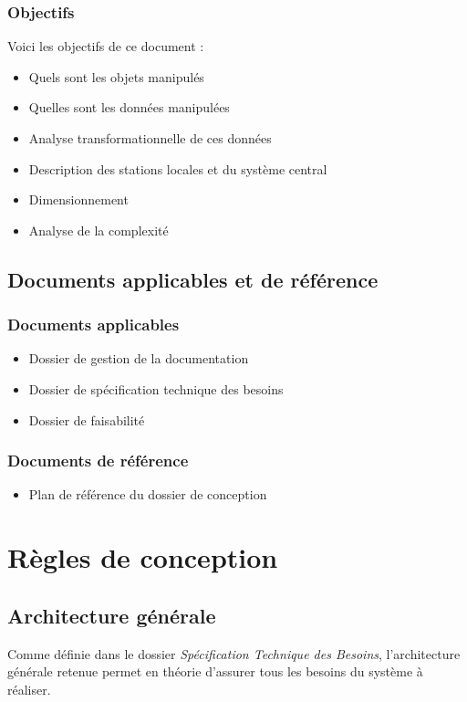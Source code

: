 \documentclass[a4paper, 11pt, final]{article}
\begin{document}
\subsubsection{Objectifs}
Voici les objectifs de ce document :
\begin{itemize}
\item Quels sont les objets manipulés
\item Quelles sont les données manipulées
\item Analyse transformationnelle de ces données
\item Description des stations locales et du système central
\item Dimensionnement
\item Analyse de la complexité
\end{itemize}

\subsection{Documents applicables et de référence}
\subsubsection{Documents applicables}
\begin{itemize}
\item Dossier de gestion de la documentation
\item Dossier de spécification technique des besoins
\item Dossier de faisabilité
\end{itemize}

\subsubsection{Documents de référence}
\begin{itemize}
\item Plan de référence du dossier de conception
\end{itemize}


\section{Règles de conception}

\subsection{Architecture générale}
Comme définie dans le dossier \emph{Spécification Technique des
Besoins}, l'architecture générale retenue permet en théorie d'assurer
tous les besoins du système à réaliser.
\end{document}

